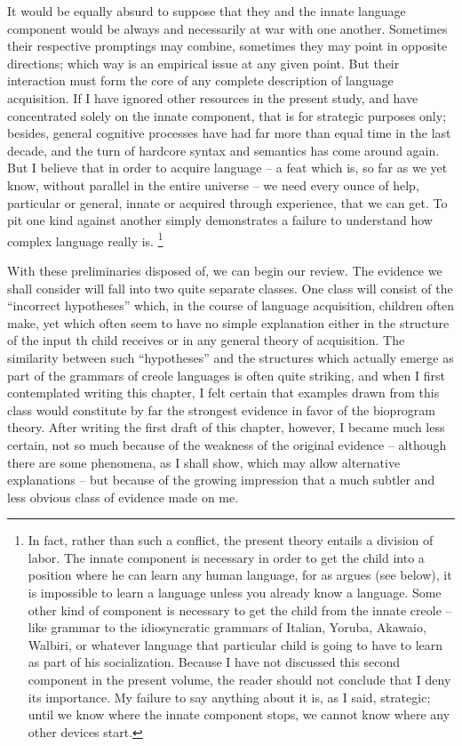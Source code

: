 It would be equally absurd to suppose that they and the innate language component would be always and necessarily at war with one another. Sometimes their respective promptings may combine, sometimes they may point in opposite directions; which way is an empirical issue at any given point. But their interaction must form the core of any complete description of language acquisition. If I have ignored other resources in the present study, and have concentrated solely on the innate component, that is for strategic purposes only; besides, general cognitive processes have had far more than equal time in the last decade, and the turn of hardcore syntax and semantics has come around again. But I believe that in order to acquire language -- a feat which is, so far as we yet know, without parallel in the entire universe -- we need every ounce of help, particular or general, innate or acquired through experience, that we can get. To pit one kind against another simply demonstrates a failure to understand how complex language really is.
\footnote{In fact, rather than such a conflict, the present theory entails a division of labor. The innate component is necessary in order to get the child into a position where he can learn any human language, for as \citet{Fodor1975} argues (see below), it is impossible to learn a language unless you already know a language. Some other kind of component is necessary to get the child from the innate creole -- like grammar to the idiosyncratic grammars of Italian, Yoruba, Akawaio, Walbiri, or whatever language that particular child is going to have to learn as part of his socialization. Because I have not discussed this second component in the present volume, the reader should not conclude that I deny its importance. My failure to say anything about it is, as I said, strategic; until we know where the innate component stops, we cannot know where any other devices start.}

With these preliminaries disposed of, we can begin our review. The evidence we shall consider will fall into two quite separate classes. One class will consist of the ``incorrect hypotheses'' which, in the course of language acquisition, children often make, yet which often seem to have no simple explanation either in the structure of the input th child receives or in any general theory of acquisition. The similarity between such ``hypotheses'' and the structures which actually emerge as part of the grammars of creole languages is often quite striking, and when I first contemplated writing this chapter, I felt certain that examples drawn from this class would constitute by far the strongest evidence in favor of the bioprogram theory. After writing the first draft of this chapter, however, I became much less certain, not so much because of the weakness of the original evidence -- although there are some phenomena, as I shall show, which may allow alternative explanations -- but because of the growing impression that a much subtler and less obvious class of evidence made on me.

